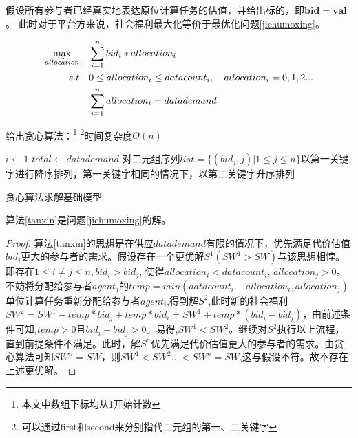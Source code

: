\documentclass[promaster]{thesis-uestc}
\begin{document}
假设所有参与者已经真实地表达原位计算任务的估值，并给出标的，即$\mathbf{bid} = \mathbf{val}$。 此时对于平台方来说，社会福利最大化等价于最优化问题\ref{jichumoxing}。

\begin{align}
    \label{jichumoxing}\max_{\vec{allocation}} \quad&\sum_{i=1}^{n}{bid_i*allocation_i}\\
    s.t                     \quad& 0\leq allocation_i\leq datacount_i,\quad allocation_i = {0,1,2...}\notag\\
                            \quad& \sum_{i=1}^{n}{allocation_i} = datademand\notag 
\end{align}

给出贪心算法：\footnote{本文中数组下标均从1开始计数}
\footnote{可以通过first和second来分别指代二元组的第一、二关键字}时间复杂度$O(n)$

\begin{algorithm}[H] 
    $i \leftarrow 1$\;
    $total \leftarrow datademand $\;
    对二元组序列$list = \{(bid_j,j)|1 \leq j \leq n\}$以第一关键字进行降序排列，第一关键字相同的情况下，以第二关键字升序排列\;
\caption{贪心算法求解基础模型}
\label{tanxin}
\end{algorithm}

\begin{theorem}
算法\ref{tanxin}是问题\ref{jichumoxing}的解。
\end{theorem}

\begin{proof}
    算法\ref{tanxin}的思想是在供应$datademand$有限的情况下，优先满足代价估值$bid_i$更大的参与者的需求。假设存在一个更优解$S^1(SW^1 > SW)$与该思想相悖。即存在$1 \leq i \neq j \leq n,bid_i > bid_j$, 使得$allocation_i < datacount_i \text{, } allocation_j > 0$。不妨将分配给参与者$agent_j$的$temp = min(datacount_i - allocation_i,allocation_j)$单位计算任务重新分配给参与者$agent_i$,得到解$S^2$,此时新的社会福利$SW^2= SW^1- temp*bid_j + temp*bid_i=SW^1+temp*(bid_i-bid_j)$，由前述条件可知,$temp > 0$且$bid_i - bid_j > 0$。易得,$SW^1<SW^2 $。继续对$S^2$执行以上流程，直到前提条件不满足。此时，解$S^n$优先满足代价估值更大的参与者的需求。由贪心算法可知$SW^n = SW$，则$SW^1<SW^2...<SW^n=SW$,这与假设不符。故不存在上述更优解。
\end{proof}
\end{document}
